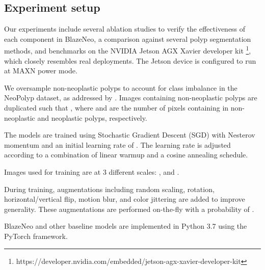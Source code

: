 \documentclass{ieeeaccess}
\newcommand{\ModelName}{BlazeNeo\xspace}
\newcommand{\DatasetName}{NeoPolyp\xspace}
\begin{document}
\subsection{Experiment setup}
\begin{center}
    \begin{figure*}[ht]
        \caption{Dice scores and FPS for different \ModelName variations, with and without auxiliary training. Red triangles denote results with auxiliary training, while blue circles are those without auxiliary training.}
        \label{fig:aux-effectiveness}
    \end{figure*}
\end{center}



Our experiments include several ablation studies to verify the effectiveness of each component in \ModelName, a comparison against several polyp segmentation methods, and benchmarks on the NVIDIA Jetson AGX Xavier developer kit \footnote{https://developer.nvidia.com/embedded/jetson-agx-xavier-developer-kit}, which closely resembles real deployments. The Jetson device is configured to run at MAXN power mode.

We oversample non-neoplastic polyps to account for class imbalance in the \DatasetName dataset, as addressed by \cite{lan2021neounet}. Images containing non-neoplastic polyps are duplicated such that , where  and  are the number of pixels containing in  non-neoplastic and neoplastic polyps, respectively.

The models are trained using Stochastic Gradient Descent (SGD) with Nesterov momentum and an initial learning rate of . The learning rate is adjusted according to a combination of linear warmup and a cosine annealing schedule.

Images used for training are at 3 different scales: ,  and .

During training, augmentations including random scaling, rotation, horizontal/vertical flip, motion blur, and color jittering are added to improve generality. These augmentations are performed on-the-fly with a probability of .

\ModelName and other baseline models are implemented in Python 3.7 using the PyTorch framework.
\end{document}
